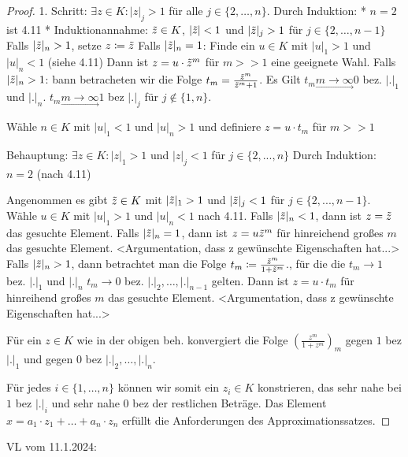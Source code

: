 \documentclass[../main.tex]{subfiles}
\begin{document}
\begin{proof}
    1. Schritt: $\exists z\in K: |z|_j > 1$ für alle $j\in \{2,\dots,n\}$.
    Durch Induktion: * $n=2$ ist 4.11 \checkmark
    * Induktionannahme: $\Tilde{z}\in K$, $|\Tilde{z}| < 1$ und $|\Tilde{z}|_j > 1$ für $j\in \{2,\dots, n-1\}$
    Falls $|\Tilde{z}|_n > 1$, setze $z\coloneqq \Tilde{z}$
    Falls $|\Tilde{z}|_n = 1$: Finde ein $u\in K$ mit $|u|_1 >1$ und $|u|_n <1$ (siehe 4.11)
    Dann ist $z = u\cdot \Tilde{z}^m$ für $m>>1$ eine geeignete Wahl.
    Falls $|\Tilde{z}|_n >1$: bann betracheten wir die Folge $t_m = \frac{\Tilde{z}^m}{\Tilde{z}^m +1}$. Es Gilt $t_m \underset{\longrightarrow}{m\rightarrow\infty} 0$ bez. $|.|_1$ und $|.|_n$.
    $t_m \underset{\longrightarrow}{m\rightarrow\infty} 1$ bez $|.|_j$ für $j\notin \{1,n\}$.

    Wähle $n\in K$ mit $|u|_1<1$ und $|u|_n>1$ und definiere $z=u\cdot t_m$ für $m>>1$




    
    Behauptung: $\exists z\in K: |z|_1 > 1$ und $|z|_j<1$ für $j\in \{2,...,n\}$
    Durch Induktion: $n=2$ \checkmark (nach 4.11)

    Angenommen es gibt $\Tilde{z}\in K$ mit $|\Tilde{z}|_1 > 1$ und $|\Tilde{z}|_j <1$ für $j\in \{2,...,n-1\}$.
    Wähle $u\in K$ mit $|u|_1>1$ und $|u|_n<1$ nach 4.11.
    Falls $|\Tilde{z}|_n<1$, dann ist $z=\Tilde{z}$ das gesuchte Element.
    Falls $|\Tilde{z}|_n = 1$, dann ist $z=u\Tilde{z}^m$ für hinreichend großes $m$ das gesuchte Element.
    <Argumentation, dass z gewünschte Eigenschaften hat...>
    Falls $|\Tilde{z}|_n > 1$, dann betrachtet man die Folge $t_m\coloneqq \frac{\Tilde{z}^m}{1+\Tilde{z}^m}$., für die die 
    $t_m\rightarrow 1$ bez. $|.|_1$ und $|.|_n$
    $t_m\rightarrow 0$ bez. $|.|_2,\dots,|.|_{n-1}$ gelten.
    Dann ist $z=u\cdot t_m$ für hinreihend großes $m$ das gesuchte Element.
    <Argumentation, dass z gewünschte Eigenschaften hat...>

    Für ein $z\in K$ wie in der obigen beh. konvergiert die Folge $(\frac{z^m}{1+z^m})_m$ gegen $1$ bez $|.|_1$ und gegen $0$ bez $|.|_2,\dots,|.|_n$.

    Für jedes $i\in \{1,\dots,n\}$ können wir somit ein $z_i\in K$ konstrieren, das sehr nahe bei $1$ bez $|.|_i$ und sehr nahe $0$ bez der restlichen Beträge.
    Das Element $x=a_1\cdot z_1 + \dots +a_n\cdot z_n$ erfüllt die Anforderungen des Approximationssatzes. 
\end{proof}
\begin{flushright}
VL vom 11.1.2024:
\end{flushright}
\end{document}
